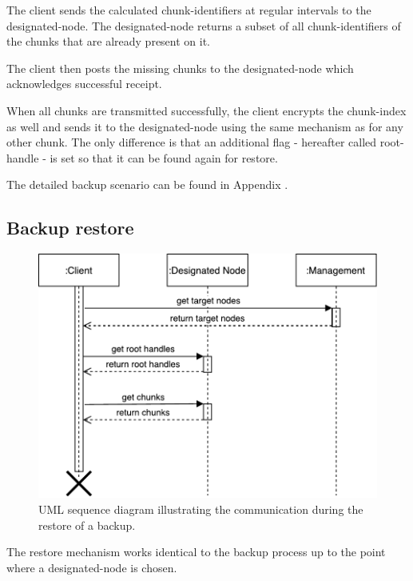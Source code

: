 The \gls{client} sends the calculated \glspl{chunk-identifier} at regular intervals to the \gls{designated-node}. The \gls{designated-node} returns a subset of all \glspl{chunk-identifier} of the \glspl{chunk} that are already present on it.

The \gls{client} then posts the missing \glspl{chunk} to the \gls{designated-node} which acknowledges successful receipt.

When all \glspl{chunk} are transmitted successfully, the client encrypts the \gls{chunk-index} as well and sends it to the \gls{designated-node} using the same mechanism as for any other \gls{chunk}. The only difference is that an additional flag - hereafter called \gls{root-handle} - is set so that it can be found again for restore.

The detailed backup scenario can be found in Appendix .

\subsection{Backup restore}

\begin{figure}[h]
    \centering
    \includegraphics[width=\linewidth]{resources/backup_restore_designated}
    \caption[Backup Restore UML Sequence Diagram]{UML sequence diagram illustrating the communication during the restore of a backup.}
\end{figure}

The restore mechanism works identical to the backup process up to the point where a \gls{designated-node} is chosen.

